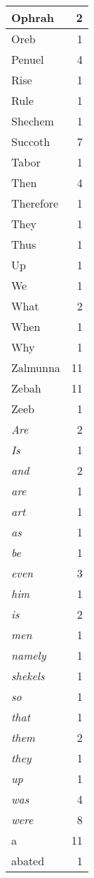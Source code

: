 \begin{center}
\begin{longtable}{l|r}
Ophrah & 2\\ \hline 
Oreb & 1\\ \hline 
Penuel & 4\\ \hline 
Rise & 1\\ \hline 
Rule & 1\\ \hline 
Shechem & 1\\ \hline 
Succoth & 7\\ \hline 
Tabor & 1\\ \hline 
Then & 4\\ \hline 
Therefore & 1\\ \hline 
They & 1\\ \hline 
Thus & 1\\ \hline 
Up & 1\\ \hline 
We & 1\\ \hline 
What & 2\\ \hline 
When & 1\\ \hline 
Why & 1\\ \hline 
Zalmunna & 11\\ \hline 
Zebah & 11\\ \hline 
Zeeb & 1\\ \hline 
\emph{Are} & 2\\ \hline 
\emph{Is} & 1\\ \hline 
\emph{and} & 2\\ \hline 
\emph{are} & 1\\ \hline 
\emph{art} & 1\\ \hline 
\emph{as} & 1\\ \hline 
\emph{be} & 1\\ \hline 
\emph{even} & 3\\ \hline 
\emph{him} & 1\\ \hline 
\emph{is} & 2\\ \hline 
\emph{men} & 1\\ \hline 
\emph{namely} & 1\\ \hline 
\emph{shekels} & 1\\ \hline 
\emph{so} & 1\\ \hline 
\emph{that} & 1\\ \hline 
\emph{them} & 2\\ \hline 
\emph{they} & 1\\ \hline 
\emph{up} & 1\\ \hline 
\emph{was} & 4\\ \hline 
\emph{were} & 8\\ \hline 
a & 11\\ \hline 
abated & 1\\ \hline 

\end{longtable}
\end{center}
